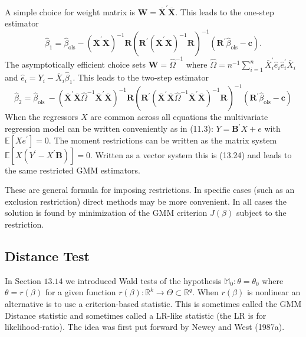 \documentclass[10pt]{article}
\begin{document}
A simple choice for weight matrix is $\boldsymbol{W}=\overline{\boldsymbol{X}}^{\prime} \overline{\boldsymbol{X}}$. This leads to the one-step estimator
$$
\widehat{\beta}_{1}=\widehat{\beta}_{\mathrm{ols}}-\left(\overline{\boldsymbol{X}}^{\prime} \overline{\boldsymbol{X}}\right)^{-1} \boldsymbol{R}\left(\boldsymbol{R}^{\prime}\left(\overline{\boldsymbol{X}}^{\prime} \overline{\boldsymbol{X}}\right)^{-1} \boldsymbol{R}\right)^{-1}\left(\boldsymbol{R}^{\prime} \widehat{\beta}_{\mathrm{ols}}-\boldsymbol{c}\right) .
$$
The asymptotically efficient choice sets $\boldsymbol{W}=\widehat{\Omega}^{-1}$ where $\widehat{\Omega}=n^{-1} \sum_{i=1}^{n} \bar{X}_{i}^{\prime} \widehat{e}_{i} \widehat{e}_{i}^{\prime} \bar{X}_{i}$ and $\widehat{e}_{i}=Y_{i}-\bar{X}_{i} \widehat{\beta}_{1}$. This leads to the two-step estimator
$$
\widehat{\beta}_{2}=\widehat{\beta}_{\text {ols }}-\left(\overline{\boldsymbol{X}}^{\prime} \overline{\boldsymbol{X}} \widehat{\Omega}^{-1} \overline{\boldsymbol{X}}^{\prime} \overline{\boldsymbol{X}}\right)^{-1} \boldsymbol{R}\left(\boldsymbol{R}^{\prime}\left(\overline{\boldsymbol{X}}^{\prime} \overline{\boldsymbol{X}} \widehat{\Omega}^{-1} \overline{\boldsymbol{X}}^{\prime} \overline{\boldsymbol{X}}\right)^{-1} \boldsymbol{R}\right)^{-1}\left(\boldsymbol{R}^{\prime} \widehat{\beta}_{\mathrm{ols}}-\boldsymbol{c}\right)
$$
When the regressors $X$ are common across all equations the multivariate regression model can be written conveniently as in (11.3): $Y=\boldsymbol{B}^{\prime} X+e$ with $\mathbb{E}\left[X e^{\prime}\right]=0$. The moment restrictions can be written as the matrix system $\mathbb{E}\left[X\left(Y^{\prime}-X^{\prime} \boldsymbol{B}\right)\right]=0$. Written as a vector system this is (13.24) and leads to the same restricted GMM estimators.

These are general formula for imposing restrictions. In specific cases (such as an exclusion restriction) direct methods may be more convenient. In all cases the solution is found by minimization of the GMM criterion $J(\beta)$ subject to the restriction.

\subsection{Distance Test}
In Section $13.14$ we introduced Wald tests of the hypothesis $\mathbb{M}_{0}: \theta=\theta_{0}$ where $\theta=r(\beta)$ for a given function $r(\beta): \mathbb{R}^{k} \rightarrow \Theta \subset \mathbb{R}^{q}$. When $r(\beta)$ is nonlinear an alternative is to use a criterion-based statistic. This is sometimes called the GMM Distance statistic and sometimes called a LR-like statistic (the LR is for likelihood-ratio). The idea was first put forward by Newey and West (1987a).
\end{document}
